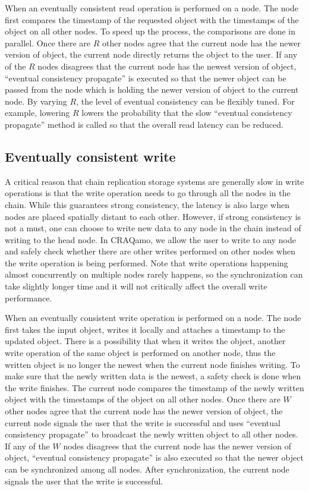 When an eventually consistent read operation is performed on a node. The node first compares the timestamp of the requested object with the timestamps of the object on all other nodes. To speed up the process, the comparisons are done in parallel. Once there are $R$ other nodes agree that the current node has the newer version of object, the current node directly returns the object to the user. If any of the $R$ nodes disagrees that the current node has the newest version of object, ``eventual consistency propagate'' is executed so that the newer object can be passed from the node which is holding the newer version of object to the current node. By varying $R$, the level of eventual consistency can be flexibly tuned. For example, lowering $R$ lowers the probability that the slow ``eventual consistency propagate'' method is called so that the overall read latency can be reduced.

\subsection{Eventually consistent write}
A critical reason that chain replication storage systems are generally slow in write operations is that the write operation needs to go through all the nodes in the chain. While this guarantees strong consistency, the latency is also large when nodes are placed spatially distant to each other. However, if strong consistency is not a must, one can choose to write new data to any node in the chain instead of writing to the head node. In CRAQamo, we allow the user to write to any node and safely check whether there are other writes performed on other nodes when the write operation is being performed. Note that write operations happening almost concurrently on multiple nodes rarely happens, so the synchronization can take slightly longer time and it will not critically affect the overall write performance.

When an eventually consistent write operation is performed on a node. The node first takes the input object, writes it locally and attaches a timestamp to the updated object. There is a possibility that when it writes the object, another write operation of the same object is performed on another node, thus the written object is no longer the newest when the current node finishes writing. To make sure that the newly written data is the newest, a safety check is done when the write finishes. The current node compares the timestamp of the newly written object with the timestamps of the object on all other nodes. Once there are $W$ other nodes agree that the current node has the newer version of object, the current node signals the user that the write is successful and uses ``eventual consistency propagate'' to broadcast the newly written object to all other nodes. If any of the $W$ nodes disagrees that the current node has the newer version of object, ``eventual consistency propagate'' is also executed so that the newer object can be synchronized among all nodes. After synchronization, the current node signals the user that the write is successful. 



